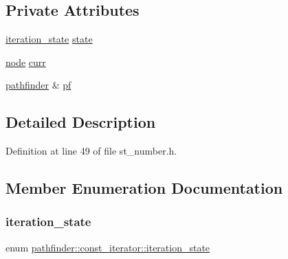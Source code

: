\subsection*{Private Attributes}
\begin{DoxyCompactItemize}
\item 
\mbox{\hyperlink{classpathfinder_1_1const__iterator_a0f4ffc8bec85488c37e68ddb247e6e47}{iteration\+\_\+state}} \mbox{\hyperlink{classpathfinder_1_1const__iterator_aa63c53f506ead02a0147e88f02b909cd}{state}}
\item 
\mbox{\hyperlink{classnode}{node}} \mbox{\hyperlink{classpathfinder_1_1const__iterator_a76b08ac8c5b5055b95cc37d5a14d54e4}{curr}}
\item 
\mbox{\hyperlink{classpathfinder}{pathfinder}} \& \mbox{\hyperlink{classpathfinder_1_1const__iterator_a913c0268881f3da2ae1b95165a21a85d}{pf}}
\end{DoxyCompactItemize}


\subsection{Detailed Description}


Definition at line 49 of file st\+\_\+number.\+h.



\subsection{Member Enumeration Documentation}
\mbox{\label{classpathfinder_1_1const__iterator_a0f4ffc8bec85488c37e68ddb247e6e47}} 
\subsubsection{\texorpdfstring{iteration\+\_\+state}{iteration\_state}}
{\footnotesize\ttfamily enum \mbox{\hyperlink{classpathfinder_1_1const__iterator_a0f4ffc8bec85488c37e68ddb247e6e47}{pathfinder\+::const\+\_\+iterator\+::iteration\+\_\+state}}\hspace{0.3cm}{\ttfamily [private]}}

